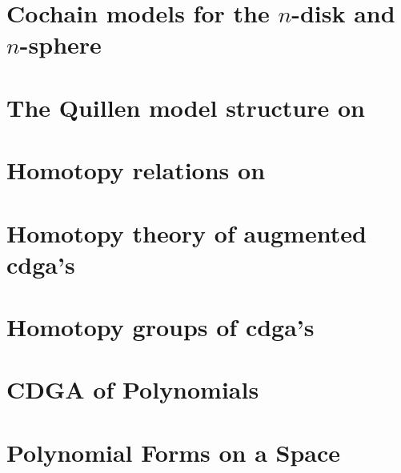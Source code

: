 \section{Cochain models for the $n$-disk and $n$-sphere}


\section{The Quillen model structure on \titleCDGA}


\section{Homotopy relations on \titleCDGA}


\section{Homotopy theory of augmented cdga's}


\section{Homotopy groups of cdga's}



\label{sec:cdga-of-polynomials}

\section{CDGA of Polynomials}


\section{Polynomial Forms on a Space}
\label{sec:polynomial-forms}





